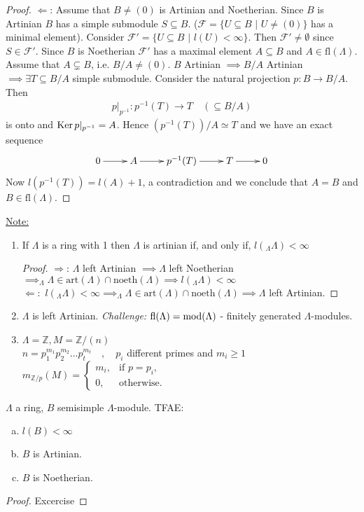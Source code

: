 \begin{proof}
\noindent\underline{\Large\(\Leftarrow\)}: Assume that \(B\neq (0)\) is Artinian and Noetherian. Since \(B\) is Artinian \(B\) has a simple submodule \(S\subseteq B\). (\(\mathcal{F} = \{U\subseteq B\,\, |\,\, U\neq (0)\}\) has a minimal element). Consider \(\mathcal{F}' = \{U\subseteq B\,\, |\,\, l(U) < \infty \}\). Then \(\mathcal{F}' \neq \emptyset\) since \(S\in\mathcal{F}'\). Since \(B\) is Noetherian \(\mathcal{F}'\) has a maximal element \(A\subseteq B\) and \(A \in \text{fl}(\Lambda)\). Assume that \(A\subsetneq B\), i.e. \(B/A\neq (0)\). \(B\) Artinian \(\implies B/A\) Artinian \(\implies \exists T\subseteq B/A\) simple submodule. Consider the natural projection \(p:B\rightarrow B/A\). Then 
\begin{align*}
    p|_{p^{-1}} :p^{-1}(T)\rightarrow T \quad(\subseteq B/A)
\end{align*}
is onto and \(\operatorname{Ker}\nolimits p|_{p^{-1}} = A\). Hence \((p^{-1}(T))/A\simeq T\) and we have an exact sequence
\begin{align*}
    \xymatrix{0\ar[r] & A\ar[r] & p^{-1}(T)\ar[r] & T\ar[r] & 0}
\end{align*}
Now \(l(p^{-1}(T)) = l(A) + 1\), a contradiction and we conclude that \(A = B\) and \(B\in\text{fl}(\Lambda)\).
\end{proof}
\noindent\underline{Note: } 
\begin{enumerate}[(1)]
    \item If \(\Lambda\) is a ring with 1 then \(\Lambda\) is artinian if, and only if, \(l(_{\Lambda}\Lambda)<\infty\)\\
    \begin{proof} \underline{\(\Rightarrow\)}: \(\Lambda\) left Artinian \(\implies \Lambda\) left Noetherian \(\implies _\Lambda\Lambda\in\text{art}(\Lambda)\cap\text{noeth}(\Lambda)\implies l(_\Lambda\Lambda)<\infty\)\\
    \underline{\(\Leftarrow: \)} \(l(_\Lambda\Lambda) < \infty \implies _\Lambda\Lambda \in \text{art}(\Lambda)\cap\text{noeth}(\Lambda)\implies\Lambda\) left Artinian.
    \end{proof}
    \item \(\Lambda\) is left Artinian. \textit{Challenge:} \(\operatorname{fl}\nolimits(\Lambda) = \operatorname{mod}\nolimits(\Lambda)\) - finitely generated \(\Lambda\)-modules. 
    \item \(\Lambda = \mathbb{Z}, M = \mathbb{Z}/(n)\) \\
    \(n = p_1^{m_1}p_2^{m_2}\dots p_t^{m_t}\quad,\quad p_i\) different primes and \(m_i\geq 1\)\\
    \(m_{\mathbb{Z}/p}(M) = \begin{cases}m_i, & \text{if } p = p_i, \\ 0, & \text{otherwise}.\end{cases}\)
\end{enumerate}
\begin{prop}\label{prop:15}
    \(\Lambda\) a ring, \(B\) semisimple \(\Lambda\)-module. TFAE:
    \begin{enumerate}[(a)]
        \item \(l(B) <\infty \)
        \item \(B\) is Artinian. 
        \item \(B\) is Noetherian. 
    \end{enumerate}
\end{prop}
\begin{proof}
    Excercise
\end{proof}
